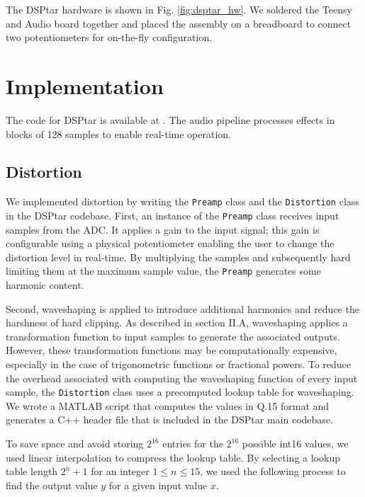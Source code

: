 \documentclass[conference]{IEEEtran}
\begin{document}
The DSPtar hardware is shown in Fig. \ref{fig:dsptar_hw}. We  soldered the Teensy and Audio board together and placed the assembly on a breadboard to connect two potentiometers for on-the-fly configuration.

\section{Implementation}

The code for DSPtar is available at \cite{dsptar_gh}. The audio pipeline processes effects in blocks of 128 samples to enable real-time operation.

\subsection{Distortion}

We  implemented distortion by writing the \texttt{Preamp} class and the \texttt{Distortion} class in the DSPtar codebase. First, an instance of the  \texttt{Preamp} class receives input samples from the ADC. It applies a gain to the input signal; this gain is configurable using a physical potentiometer enabling the user to change the distortion level in real-time. By multiplying the samples and subsequently hard limiting them at the maximum sample value, the  \texttt{Preamp} generates some harmonic content. 

Second, waveshaping is applied to introduce additional harmonics and reduce the harshness of hard clipping. As described in section II.A, waveshaping applies a transformation function to input samples to generate the associated outputs. However, these transformation functions may be computationally expensive, especially in the case of trigonometric functions or fractional powers. To reduce the overhead associated with computing the waveshaping function of every input sample, the \texttt{Distortion} class uses a precomputed lookup table for waveshaping. We  wrote a MATLAB script that computes the values in Q.15 format and generates a C++ header file that is included in the DSPtar main codebase. 

To save space and avoid storing $2^{16}$ entries for the $2^{16}$ possible int16 values, we  used linear interpolation to compress the lookup table. By selecting a lookup table length $2^n + 1$ for an integer $1 \leq n \leq 15$, we used the following process to find the output value $y$ for a given input value $x$. 
\end{document}
